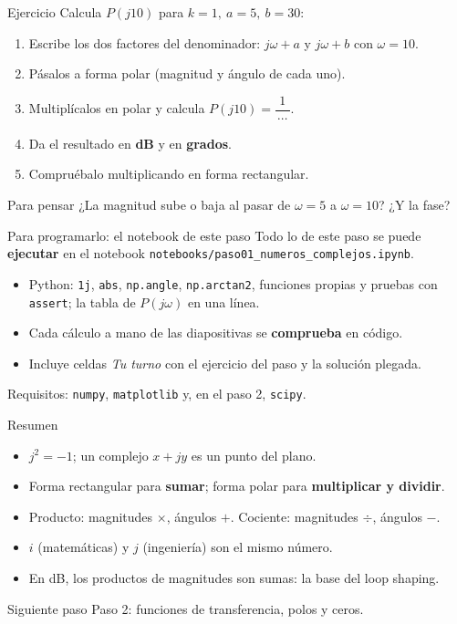 \documentclass[aspectratio=169,11pt]{beamer}
\begin{document}
\begin{frame}{Ejercicio}
  Calcula $P(j10)$ para $k=1,\ a=5,\ b=30$:
  \begin{enumerate}
    \item Escribe los dos factores del denominador: $j\omega+a$ y $j\omega+b$ con $\omega=10$.
    \item Pásalos a forma polar (magnitud y ángulo de cada uno).
    \item Multiplícalos en polar y calcula $P(j10)=\dfrac{1}{\,\cdots\,}$.
    \item Da el resultado en \textbf{dB} y en \textbf{grados}.
    \item Compruébalo multiplicando en forma rectangular.
  \end{enumerate}
  \vspace{4pt}
  \begin{block}{Para pensar}
    ¿La magnitud sube o baja al pasar de $\omega=5$ a $\omega=10$? ¿Y la fase?
  \end{block}
\end{frame}

\begin{frame}{Para programarlo: el notebook de este paso}
  \small
  Todo lo de este paso se puede \textbf{ejecutar} en el notebook \texttt{notebooks/paso01\_numeros\_complejos.ipynb}.
  \begin{itemize}
    \item Python: \texttt{1j}, \texttt{abs}, \texttt{np.angle}, \texttt{np.arctan2}, funciones propias y pruebas con \texttt{assert}; la tabla de $P(j\omega)$ en una línea.
    \item Cada cálculo a mano de las diapositivas se \textbf{comprueba} en código.
    \item Incluye celdas \emph{Tu turno} con el ejercicio del paso y la solución plegada.
  \end{itemize}
  \footnotesize Requisitos: \texttt{numpy}, \texttt{matplotlib} y, en el paso 2, \texttt{scipy}.
\end{frame}

\begin{frame}{Resumen}
  \begin{itemize}
    \item $j^2=-1$; un complejo $x+jy$ es un punto del plano.
    \item Forma rectangular para \textbf{sumar}; forma polar para \textbf{multiplicar y dividir}.
    \item Producto: magnitudes $\times$, ángulos $+$. Cociente: magnitudes $\div$, ángulos $-$.
    \item $i$ (matemáticas) y $j$ (ingeniería) son el mismo número.
    \item En dB, los productos de magnitudes son sumas: la base del loop shaping.
  \end{itemize}
  \vspace{6pt}
  \begin{block}{Siguiente paso}
    Paso 2: funciones de transferencia, polos y ceros.
  \end{block}
\end{frame}
\end{document}
